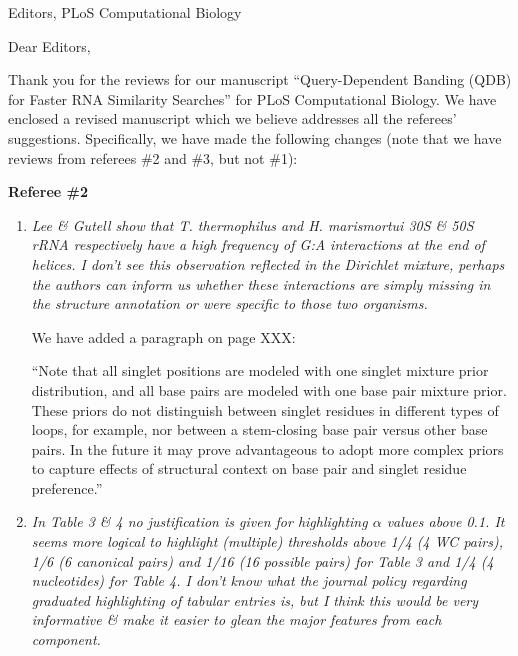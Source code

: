 \documentclass{jfrcletter}
\begin{document}
\signature{Sean R. Eddy, Ph.D.}

%
\begin{letter}{Editors, PLoS Computational Biology}

%
\opening{Dear Editors,}

Thank you for the reviews for our manuscript ``Query-Dependent Banding
(QDB) for Faster RNA Similarity Searches'' for PLoS Computational
Biology. We have enclosed a revised manuscript which we believe
addresses all the referees' suggestions. Specifically, we have made
the following changes (note that we have reviews from referees \#2 and
\#3, but not \#1):

\textbf{Referee \#2}

\begin{enumerate}
\item  \emph{\footnotesize Lee \& Gutell show that T. thermophilus and H. marismortui 30S \& 50S
   rRNA respectively have a high frequency of G:A interactions at the end
   of helices. I don't see this observation reflected in the Dirichlet
   mixture, perhaps the authors can inform us whether these interactions
   are simply missing in the structure annotation or were specific to
   those two organisms.}

   We have added a paragraph on page XXX:

   ``Note that all singlet positions are modeled with one singlet
   mixture prior distribution, and all base pairs are modeled with one
   base pair mixture prior. These priors do not distinguish between
   singlet residues in different types of loops, for example, nor
   between a stem-closing base pair versus other base pairs. In the
   future it may prove advantageous to adopt more complex priors to
   capture effects of structural context on base pair and
   singlet residue preference.''

\item \emph{\footnotesize In Table 3 \& 4 no justification is given for highlighting
   $\alpha$ values above 0.1. It seems more logical to highlight
   (multiple) thresholds above 1/4 (4 WC pairs), 1/6 (6 canonical
   pairs) and 1/16 (16 possible pairs) for Table 3 and 1/4 (4
   nucleotides) for Table 4. I don't know what the journal policy
   regarding graduated highlighting of tabular entries is, but I
   think this would be very informative \& make it easier to glean the
   major features from each component.}


\end{enumerate}
\end{letter}
\end{document}
